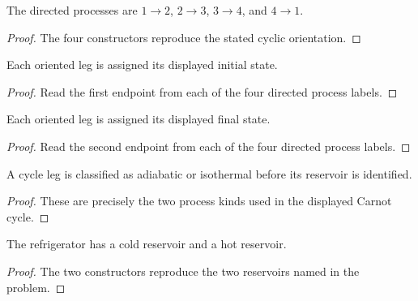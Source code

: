 \begin{definition}
  \label{def:physics:IPhO_2026_3_C_1:aux008}
  The directed processes are \(1\to2\), \(2\to3\), \(3\to4\), and
  \(4\to1\).
\end{definition}
\begin{proof}
  The four constructors reproduce the stated cyclic orientation.
\end{proof}

\begin{definition}
  \label{def:physics:IPhO_2026_3_C_1:aux009}
  Each oriented leg is assigned its displayed initial state.
\end{definition}
\begin{proof}
  Read the first endpoint from each of the four directed process labels.
\end{proof}

\begin{definition}
  \label{def:physics:IPhO_2026_3_C_1:aux010}
  Each oriented leg is assigned its displayed final state.
\end{definition}
\begin{proof}
  Read the second endpoint from each of the four directed process labels.
\end{proof}

\begin{definition}
  \label{def:physics:IPhO_2026_3_C_1:aux011}
  A cycle leg is classified as adiabatic or isothermal before its reservoir
  is identified.
\end{definition}
\begin{proof}
  These are precisely the two process kinds used in the displayed Carnot
  cycle.
\end{proof}

\begin{definition}
  \label{def:physics:IPhO_2026_3_C_1:aux012}
  The refrigerator has a cold reservoir and a hot reservoir.
\end{definition}
\begin{proof}
  The two constructors reproduce the two reservoirs named in the problem.
\end{proof}

